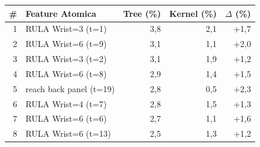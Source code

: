 \begin{tabular*}{\linewidth}{@{}r@{\extracolsep{\fill}}lrrr@{}}
\toprule
\textbf{\#} & \textbf{Feature Atomica} & \textbf{Tree (\%)} & \textbf{Kernel (\%)} & \textbf{$\Delta$ (\%)} \\
\midrule
1 & RULA Wrist=3 (t=1) & 3{,}8 & 2{,}1 & +1{,}7 \\
2 & RULA Wrist=6 (t=9) & 3{,}1 & 1{,}1 & +2{,}0 \\
3 & RULA Wrist=3 (t=2) & 3{,}1 & 1{,}9 & +1{,}2 \\
4 & RULA Wrist=6 (t=8) & 2{,}9 & 1{,}4 & +1{,}5 \\
5 & reach back panel (t=19) & 2{,}8 & 0{,}5 & +2{,}3 \\
6 & RULA Wrist=4 (t=7) & 2{,}8 & 1{,}5 & +1{,}3 \\
7 & RULA Wrist=6 (t=6) & 2{,}7 & 1{,}1 & +1{,}6 \\
8 & RULA Wrist=6 (t=13) & 2{,}5 & 1{,}3 & +1{,}2 \\
\bottomrule
\end{tabular*}
